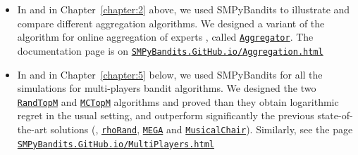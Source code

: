 \begin{itemize}
    \item
In \cite{Besson2018WCNC} and in Chapter~\ref{chapter:2} above, we used SMPyBandits to illustrate and compare different aggregation algorithms. We designed a variant of the \ExpFour{} algorithm for online aggregation of experts \cite{Bubeck12}, called \texttt{\href{https://SMPyBandits.GitHub.io/docs/Policies.Aggregator.html}{Aggregator}}.
The documentation page is on \texttt{\href{https://SMPyBandits.GitHub.io/Aggregation.html}{SMPyBandits.GitHub.io/Aggregation.html}}

    \item
In \cite{Besson2018ALT} and in Chapter~\ref{chapter:5} below, we used SMPyBandits for all the simulations for multi-players bandit algorithms. We designed the two \texttt{\href{https://SMPyBandits.GitHub.io/docs/PoliciesMultiPlayers.RandTopM.html}{RandTopM}} and \texttt{\href{https://SMPyBandits.GitHub.io/docs/PoliciesMultiPlayers.MCTopM.html}{MCTopM}} algorithms and proved than they obtain logarithmic regret in the usual setting, and outperform significantly the previous state-of-the-art solutions (\ie, \texttt{\href{https://SMPyBandits.GitHub.io/docs/PoliciesMultiPlayers.rhoRand.html}{rhoRand}}, \texttt{\href{https://SMPyBandits.GitHub.io/docs/Policies.MEGA.html}{MEGA}} and \texttt{\href{https://SMPyBandits.GitHub.io/docs/Policies.MusicalChair.html}{MusicalChair}}).
Similarly, see the page \texttt{\href{https://SMPyBandits.GitHub.io/MultiPlayers.html}{SMPyBandits.GitHub.io/MultiPlayers.html}}


\end{itemize}
